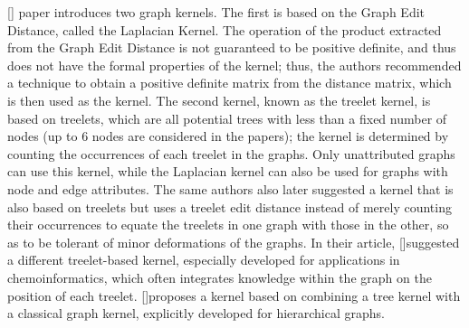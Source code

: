 [\cite{Gauzere:2012:1}] paper introduces two graph kernels. The first is based on the Graph Edit Distance, called the Laplacian Kernel. The operation of the product extracted from the Graph Edit Distance is not guaranteed to be positive definite, and thus does not have the formal properties of the kernel; thus, the authors recommended a technique to obtain a positive definite matrix from the distance matrix, which is then used as the kernel. The second kernel, known as the treelet kernel, is based on treelets, which are all potential trees with less than a fixed number of nodes (up to 6 nodes are considered in the papers); the kernel is determined by counting the occurrences of each treelet in the graphs. Only unattributed graphs can use this kernel, while the Laplacian kernel can also be used for graphs with node and edge attributes. The same authors also later suggested a kernel that is also based on treelets but uses a treelet edit distance instead of merely counting their occurrences to equate the treelets in one graph with those in the other, so as to be tolerant of minor deformations of the graphs. In their article, [\cite{Grenier:2013}]suggested a different treelet-based kernel, especially developed for applications in chemoinformatics, which often integrates knowledge within the graph on the position of each treelet. [\cite{BarbaraStrug:2011}]proposes a kernel based on combining a tree kernel with a classical graph kernel, explicitly developed for hierarchical graphs.